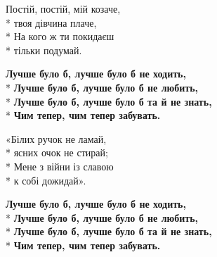 \medskip

\begin{minipage}{\linewidth}
Постій, постій, мій козаче,\\*
твоя дівчина плаче,\\*
На кого ж ти покидаєш\\*
тільки подумай.\\
\end{minipage}\par\medskip\nobreak

\medskip

\begin{minipage}{\linewidth}
\hspace*{1.5em}\textbf{Лучше було б, лучше було б не ходить,}\\*
\hspace*{1.5em}\textbf{Лучше було б, лучше було б не любить,}\\*
\hspace*{1.5em}\textbf{Лучше було б, лучше було б та й не знать,}\\*
\hspace*{1.5em}\textbf{Чим тепер, чим тепер забувать.}\\
\end{minipage}\par\medskip\nobreak

\medskip

\begin{minipage}{\linewidth}
«Білих ручок не ламай,\\*
ясних очок не стирай;\\*
Мене з війни із славою\\*
к собі дожидай».\\
\end{minipage}\par\medskip\nobreak

\medskip

\begin{minipage}{\linewidth}
\hspace*{1.5em}\textbf{Лучше було б, лучше було б не ходить,}\\*
\hspace*{1.5em}\textbf{Лучше було б, лучше було б не любить,}\\*
\hspace*{1.5em}\textbf{Лучше було б, лучше було б та й не знать,}\\*
\hspace*{1.5em}\textbf{Чим тепер, чим тепер забувать.}\\
\end{minipage}\par\medskip\nobreak

